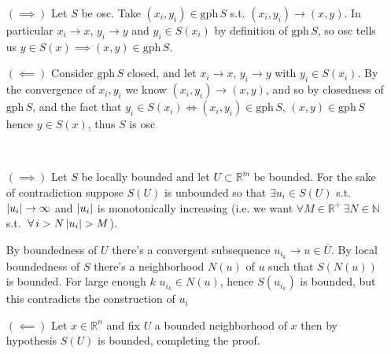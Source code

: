 \documentclass{article}
\newenvironment{ex}[1]
  {\renewcommand\theexercise{#1}\exercise}
  {\endexercise}
\newcommand{\R}[1]{\mathbb{R}^{#1}}
\begin{document}
\begin{ex}{2.11}
  \begin{itemize} \, \\
    \item[$(\implies)$]
      \newcommand{\gph}{\mathrm{gph}\,}
      Let $S$ be osc. Take $(x_i, y_i) \in \gph S$ s.t. $(x_i, y_i) \to (x, y)$. In particular $x_i \to x$, $y_i \to y$ and $y_i \in S(x_i)$ by definition of $\gph S$, so osc tells us $y \in S(x) \implies (x, y) \in \gph S$.
    \item[$(\impliedby)$]
      Consider $\gph S$ closed, and let $x_i \to x, \, y_i \to y$ with $y_i \in S(x_i)$. By the convergence of $x_i, y_i$ we know $(x_i, y_i) \to (x, y)$, and so by closedness of $\gph S$, and the fact that $y_i \in S(x_i) \iff (x_i, y_i) \in \gph S$, $(x, y) \in \gph S$ hence $y \in S(x)$, thus $S$ is osc
  \end{itemize}
\end{ex}
\begin{ex}{2.12} \, \\
  \begin{itemize}
    \item[$(\implies)$]
      \newcommand{\xb}{\overline{x}}
      Let $S$ be locally bounded and let $U \subset \R{m}$ be bounded. For the sake of contradiction suppose $S(U)$ is unbounded so that $\exists u_i \in S(U)$ s.t. $\lvert u_i\rvert \to \infty$ and $\lvert u_i\rvert$ is monotonically increasing (i.e. we want $\forall M \in \R{+} \, \exists N \in \mathbb{N}$ s.t. $\forall i > N \, \abs{u_i} > M$).

      By boundedness of $U$ there's a convergent subsequence $u_{i_k} \to u \in \overline{U}$. By local boundedness of $S$ there's a neighborhood $N(u)$ of $u$ such that $S(N(u))$ is bounded. For large enough $k$ $u_{i_k} \in N(u)$, hence $S(u_{i_k})$ is bounded, but this contradicts the construction of $u_i$
    \item[$(\impliedby)$]
      Let $x \in \R{n}$ and fix $U$ a bounded neighborhood of $x$ then by hypothesis $S(U)$ is bounded, completing the proof.
  \end{itemize}
\end{ex}
\end{document}

